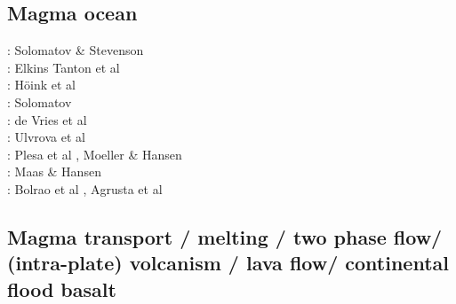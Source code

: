 \subsection{Magma ocean}

\begin{scriptsize}
\nineteenninetythree: Solomatov \& Stevenson \cite{sost93a,sost93b}\\
\twothousandtwo: Elkins Tanton et al \cite{elvh02}\\
\twothousandsix: H\"oink et al\cite{hosh06}\\
\twothousandseven: Solomatov \cite{solo07} \\
\twothousandten: de Vries et al \cite{devv10}\\
\twothousandtwelve: Ulvrova et al \cite{ullc12}\\
\twothousandthirteen: Plesa et al \cite{plth13}, Moeller \& Hansen \cite{moha13}\\
\twothousandfifteen: Maas \& Hansen \cite{maha15}\\
\twothousandtwenty: Bolrao et al \cite{bobm20}, Agrusta et al \cite{agml20}
\end{scriptsize}

\subsection{Magma transport / melting / two phase flow/ (intra-plate) volcanism / lava flow/ 
continental flood basalt}

